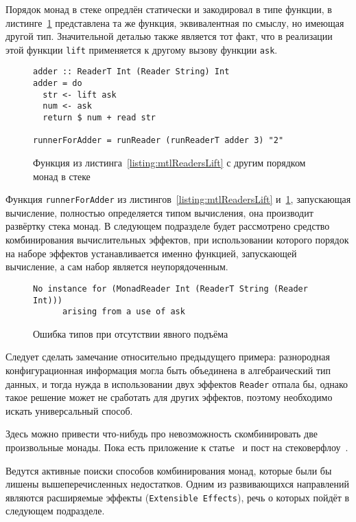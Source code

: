 Порядок монад в стеке опредлён статически и закодировал в типе функции, в листинге~\ref{listing:mtlDifferentReadersLift} представлена та же функция, эквивалентная по смыслу, но имеющая другой тип. Значительной деталью также является тот факт, что в реализации этой функции \lstinline{lift} применяется к другому вызову функции \lstinline{ask}.

\begin{figure}[t]
\begin{lstlisting}
adder :: ReaderT Int (Reader String) Int
adder = do
  str <- lift ask
  num <- ask
  return $ num + read str

runnerForAdder = runReader (runReaderT adder 3) "2"
\end{lstlisting}
\caption{Функция из листинга~\ref{listing:mtlReadersLift} с другим порядком монад в стеке}
\label{listing:mtlDifferentReadersLift}
\end{figure}

Функция \lstinline{runnerForAdder} из листингов~\ref{listing:mtlReadersLift} и~\ref{listing:mtlDifferentReadersLift}, запускающая вычисление, полностью определяется типом вычисления, она производит развёртку стека монад. В следующем подразделе будет рассмотрено средство комбинирования вычислительных эффектов, при использовании которого порядок на наборе эффектов устанавливается именно функцией, запускающей вычисление, а сам набор является неупорядоченным.

\begin{figure}[t]
\begin{lstlisting}
No instance for (MonadReader Int (ReaderT String (Reader Int)))
      arising from a use of ask
\end{lstlisting}
\caption{Ошибка типов при отсутствии явного подъёма}
\label{listing:mtlCompileError}
\end{figure}

Следует сделать замечание относительно предыдущего примера: разнородная конфигурационная информация могла быть объединена в алгебраический тип данных, и тогда нужда в использовании двух эффектов \lstinline{Reader} отпала бы, однако такое решение может не сработать для других эффектов, поэтому необходимо искать универсальный способ.

Здесь можно привести что-нибудь про невозможность скомбинировать две произвольные монады. Пока есть приложение к статье~\autocite{ComposingMonads} и пост на стековерфлоу~\autocite{SOMonadsComposition}.

Ведутся активные поиски способов комбинирования монад, которые были бы лишены вышеперечисленных недостатков. Одним из развивающихся направлений являются расширяемые эффекты (\lstinline{Extensible Effects}), речь о которых пойдёт в следующем подразделе.

